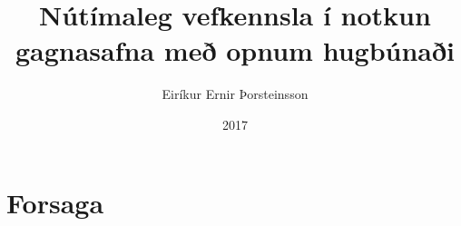 \documentclass{beamer}
\title{Nútímaleg vefkennsla í notkun gagnasafna með opnum hugbúnaði}
\author{Eiríkur Ernir Þorsteinsson}
\institute{Háskóli Íslands}
\date{2017}
\begin{document}
{
    \frame{\titlepage}
}


\frame{\tableofcontents}

\newenvironment{repnull}[0]{%
\begin{stack}
\\
\begin{rep}
}{%
\end{rep}
\end{stack}
}
\newenvironment{syntaxenv}[1]{%
\par\noindent\begin{minipage}{\linewidth}\vspace{0.5em}\begin{quote}\noindent%
\hspace*{-2em}\synt{#1}:\hfill\par%
\noindent%
\begin{minipage}{\linewidth}\begin{syntdiag}%
}{%
\end{syntdiag}\end{minipage}\end{quote}\end{minipage}%
}

\section{Forsaga}
\end{document}
